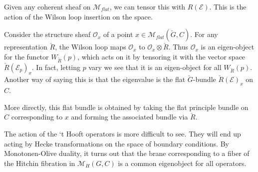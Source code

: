 	Given any coherent sheaf on $\mathcal M_{flat}$, we can tensor this with $R(\mathcal E)$. This is the action of the Wilson loop insertion on the space.
	
	Consider the structure sheaf $\mathcal O_x$ of a point $x \in \mathcal M_{flat}(\check G, C)$. For any representation $\check R$, the Wilson loop maps $\mathcal O_x$ to $\mathcal O_x \otimes \check{R}$.
	Thus $\mathcal O_x$ is an eigen-object for the functor $W_{\check R}(p)$, which acts on it by tensoring it with the vector space $\check R(\mathcal E_p)_x$. In fact, letting $p$ vary we see that it is an eigen-object for all $W_{\check R}(p)$. Another way of saying this is that the eigenvalue is the flat $\check G$-bundle $\check R(\mathcal E)_x$ on $C$.
	
	More directly, this flat bundle is obtained by taking the flat principle bundle on $C$ corresponding to $x$ and forming the associated bundle via $\check R$.
	
	The action of the `t Hooft operators is more difficult to see. They will end up acting by Hecke transformations on the space of boundary conditions. By Monotonen-Olive duality, it turns out that the brane corresponding to a fiber of the Hitchin fibration in $\mathcal M_H(G, C)$ is a common eigenobject for all operators.
	
